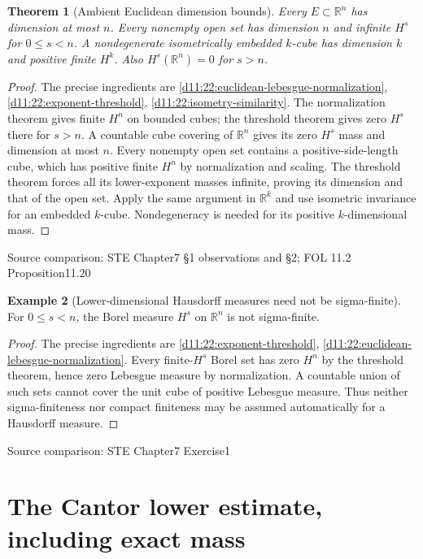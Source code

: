 \documentclass[11pt,oneside,openany]{book}
\newtheorem{theorem}{Theorem}[chapter]
\theoremstyle{definition}
\newtheorem{example}[theorem]{Example}
\theoremstyle{remark}
\newcommand{\R}{\mathbb R}\newcommand{\C}{\mathbb C}
\newcommand{\family}[1]{}
\newcommand{\source}[1]{\par\begingroup\small\sffamily\color{black!65}Source comparison: #1\par\endgroup}
\begin{document}
\begin{theorem}[Ambient Euclidean dimension bounds]\family{D11.22.euclidean_dimension}\label{d11:22:euclidean-dimension}
Every $E\subset\R^n$ has dimension at most $n$. Every nonempty open set has dimension $n$ and infinite $H^s$ for $0\le s<n$. A nondegenerate isometrically embedded $k$-cube has dimension $k$ and positive finite $H^k$. Also $H^s(\R^n)=0$ for $s>n$.
\end{theorem}
\begin{proof}
The precise ingredients are \cref{d11:22:euclidean-lebesgue-normalization}, \cref{d11:22:exponent-threshold}, \cref{d11:22:isometry-similarity}. The normalization theorem gives finite $H^n$ on bounded cubes; the threshold theorem gives zero $H^s$ there for $s>n$. A countable cube covering of $\R^n$ gives its zero $H^s$ mass and dimension at most $n$. Every nonempty open set contains a positive-side-length cube, which has positive finite $H^n$ by normalization and scaling. The threshold theorem forces all its lower-exponent masses infinite, proving its dimension and that of the open set. Apply the same argument in $\R^k$ and use isometric invariance for an embedded $k$-cube. Nondegeneracy is needed for its positive $k$-dimensional mass.
\end{proof}
\source{STE Chapter7 §1 observations and §2; FOL 11.2 Proposition11.20}

\begin{example}[Lower-dimensional Hausdorff measures need not be sigma-finite]\family{D11.22.hausdorff_nonsigmafinite}\label{d11:22:hausdorff-nonsigmafinite}
For $0\le s<n$, the Borel measure $H^s$ on $\R^n$ is not sigma-finite.
\end{example}
\begin{proof}
The precise ingredients are \cref{d11:22:exponent-threshold}, \cref{d11:22:euclidean-lebesgue-normalization}. Every finite-$H^s$ Borel set has zero $H^n$ by the threshold theorem, hence zero Lebesgue measure by normalization. A countable union of such sets cannot cover the unit cube of positive Lebesgue measure. Thus neither sigma-finiteness nor compact finiteness may be assumed automatically for a Hausdorff measure.
\end{proof}
\source{STE Chapter7 Exercise1}

\section{The Cantor lower estimate, including exact mass}
\end{document}
